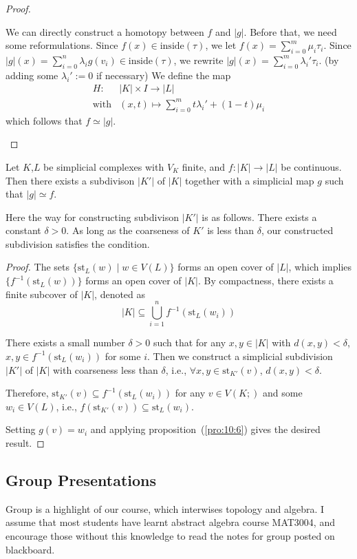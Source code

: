 \begin{proof}
\begin{itemize}
We can directly construct a homotopy between $f$ and $|g|$. Before that, we need some reformulations.
Since $f(x)\in\text{inside}(\tau)$, we let $f(x)=\sum_{i=0}^m\mu_i\tau_i$.
Since  $|g|(x)=\sum_{i=0}^n\lambda_ig(v_i)\in \text{inside}(\tau)$, we rewrite $|g|(x)=\sum_{i=0}^m\lambda_i'\tau_i$. (by adding some $\lambda_i' := 0$ if necessary)
We define the map
\[
\begin{array}{ll}
H:&|K|\times I\to |L|\\
\text{with}&(x,t)\mapsto \sum_{i=0}^mt\lambda_i'+(1-t)\mu_i
\end{array}
\]
which follows that $f\simeq |g|$.




\end{itemize}
\end{proof}

\begin{theorem}
Let $K$,$L$ be simplicial complexes with $V_K$ finite, and $f:|K|\to|L|$ be continuous.
Then there exists a subdivison $|K'|$ of $|K|$ together with a simplicial map $g$ such that $|g|\simeq f$.

Here the way for constructing subdivison $|K'|$ is as follows.
There exists a constant $\delta>0$. As long as the coarseness of $K'$ is less than $\delta$, our constructed subdivision satisfies the condition.
\end{theorem}
\begin{proof}
The sets $\{\text{st}_L(w)\mid w\in V(L)\}$ forms an open cover of $|L|$, which implies
$\{f^{-1}(\text{st}_L(w))\}$ forms an open cover of $|K|$.
By compactness, there exists a finite subcover of $|K|$, denoted as
\[
|K|\subseteq \bigcup_{i=1}^nf^{-1}(\text{st}_L(w_i))
\]

There exists a small number $\delta>0$ such that for any $x,y\in|K|$ with $d(x,y)<\delta$, $x,y\in f^{-1}(\text{st}_L(w_i))$ for some $i$.
Then we construct a simplicial subdivision $|K'|$ of $|K|$ with coarseness less than $\delta$, i.e., $\forall x,y\in\text{st}_{K'}(v)$, $d(x,y)<\delta$.

Therefore, $\text{st}_{K'}(v)\subseteq f^{-1}(\text{st}_L(w_i))$ for any $v\in V(K;)$ and some $w_i\in V(L)$, i.e., $f(\text{st}_{K'}(v))\subseteq\text{st}_L(w_i)$.

Setting $g(v)=w_i$ and applying proposition~(\ref{pro:10:6}) gives the desired result.
\end{proof}

\subsection{Group Presentations}
Group is a highlight of our course, which interwises topology and algebra.
I assume that most students have learnt abstract algebra course MAT3004, and encourage those without this knowledge to read the notes for group posted on blackboard.






















